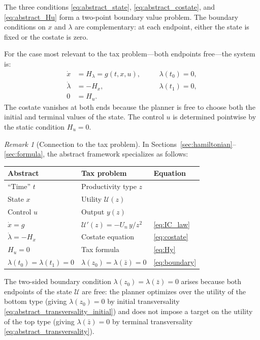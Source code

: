\documentclass[12pt,a4paper]{article}
\theoremstyle{definition}
\theoremstyle{plain}
\theoremstyle{remark}
\newtheorem{remark}{Remark}[section]
\newcommand{\zbar}{\bar{z}}
\newcommand{\zlow}{z_{\scriptscriptstyle 0}}
\newcommand{\calU}{\mathcal{U}}
\begin{document}
The three conditions \eqref{eq:abstract_state}, \eqref{eq:abstract_costate}, and \eqref{eq:abstract_Hu} form a two-point boundary value problem. The boundary conditions on $x$ and $\lambda$ are complementary: at each endpoint, either the state is fixed or the costate is zero.

For the case most relevant to the tax problem---both endpoints free---the system is:
\begin{align*}
  \dot{x} &= H_\lambda = g(t, x, u), &\quad& \lambda(t_0) = 0, \\
  \dot{\lambda} &= -H_x, && \lambda(t_1) = 0, \\
  0 &= H_u. &&
\end{align*}
The costate vanishes at both ends because the planner is free to choose both the initial and terminal values of the state. The control $u$ is determined pointwise by the static condition $H_u = 0$.

\begin{remark}[Connection to the tax problem]
In Sections~\ref{sec:hamiltonian}--\ref{sec:formula}, the abstract framework specializes as follows:
\begin{center}
\begin{tabular}{lll}
\textbf{Abstract} & \textbf{Tax problem} & \textbf{Equation} \\
\hline
``Time'' $t$ & Productivity type $z$ & \\
State $x$ & Utility $\calU(z)$ & \\
Control $u$ & Output $y(z)$ & \\
$\dot{x} = g$ & $\calU'(z) = -U_n\,y/z^2$ & \eqref{eq:IC_law} \\
$\dot{\lambda} = -H_x$ & Costate equation & \eqref{eq:costate} \\
$H_u = 0$ & Tax formula & \eqref{eq:Hy} \\
$\lambda(t_0) = \lambda(t_1) = 0$ & $\lambda(\zlow) = \lambda(\zbar) = 0$ & \eqref{eq:boundary}
\end{tabular}
\end{center}
The two-sided boundary condition $\lambda(\zlow) = \lambda(\zbar) = 0$ arises because both endpoints of the state $\calU$ are free: the planner optimizes over the utility of the bottom type (giving $\lambda(\zlow) = 0$ by initial transversality \eqref{eq:abstract_transversality_initial}) and does not impose a target on the utility of the top type (giving $\lambda(\zbar) = 0$ by terminal transversality \eqref{eq:abstract_transversality}).
\end{remark}
\end{document}
